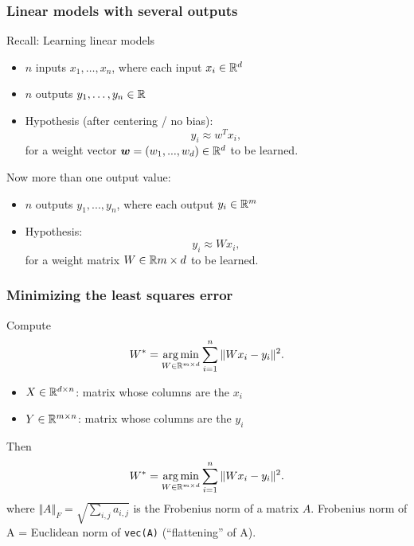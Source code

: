 \documentclass[aspectratio=149]{beamer}
\begin{document}
\begin{frame}
  \frametitle{Linear models with several outputs}
  Recall: Learning linear models
  \begin{itemize}
    \item $n$ inputs $x_1,\dots,x_n$, where each input $x_i \in \mathbb{R}^d$
    \item $n$ outputs $y_1,\dots,y_n \in \mathbb{R}$
    \item Hypothesis (after centering / no bias):
          \begin{equation}
            y_i \approx w^T x_i ,
          \end{equation}
          for a weight vector $\bm{w} = (w_1,...,w_d) \in \mathbb{R}^d$ to be learned.
  \end{itemize}

  Now more than one output value:
  \begin{itemize}
    \item $n$ outputs $y_1,...,y_n$, where each output $y_i \in \mathbb{R}^m$
    \item Hypothesis:
          \begin{equation}
            y_i \approx W x_i,
          \end{equation}
          for a weight matrix $W \in \mathbb{R}{m\times d}$ to be learned.
  \end{itemize}
\end{frame}


\begin{frame}
  \frametitle{Minimizing the least squares error}

  Compute
  \begin{equation}
    W^* = \operatorname*{arg\,min}_{W\in \mathbb{R}^{m\times d}} \sum_{i=1}^{n} \Vert W x_i - y_i \Vert^2.
  \end{equation}

  \begin{itemize}
    \item $X \in \mathbb{R}^{d \times n}$: matrix whose columns are the $x_i$
    \item $Y \in \mathbb{R}^{m \times n}$: matrix whose columns are the $y_i$
  \end{itemize}
  Then
  \begin{equation}
    W^* = \operatorname*{arg\,min}_{W\in \mathbb{R}^{m\times d}} \sum_{i=1}^{n} \Vert W x_i - y_i \Vert^2.
  \end{equation}
  where $\Vert A \Vert_F = \sqrt{\sum_{i,j} a_{i,j}}$ is the Frobenius norm of a matrix $A$.
  Frobenius norm of A = Euclidean norm of \texttt{vec(A)} (``flattening'' of A).
\end{frame}
\end{document}
